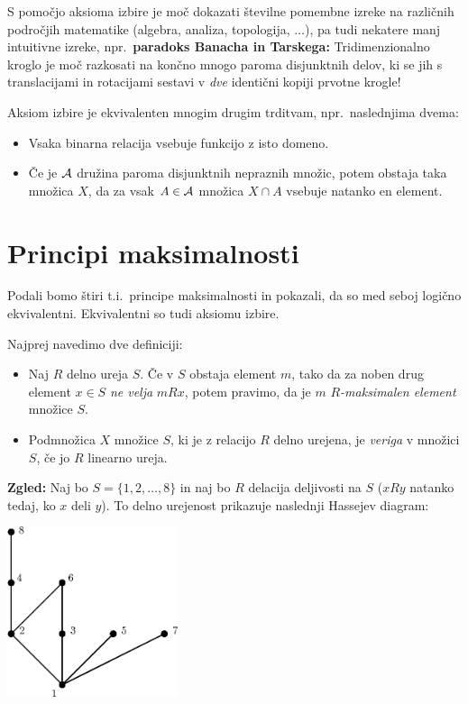 \documentclass[11pt,paper=b5,footinclude,headinclude]{scrbook} %
\begin{document}
\bigskip
S pomočjo aksioma izbire je moč dokazati številne pomembne izreke na različnih področjih matematike (algebra, analiza, topologija, $\ldots$), pa tudi nekatere manj intuitivne izreke, npr.~\textbf{paradoks Banacha in Tarskega:} Tridimenzionalno kroglo je moč razkosati na končno mnogo paroma disjunktnih delov, ki se jih s translacijami in rotacijami sestavi v {\em dve} identični kopiji prvotne krogle!

\bigskip
Aksiom izbire je ekvivalenten mnogim drugim trditvam, npr.~naslednjima dvema:
\begin{itemize}
  \item Vsaka binarna relacija vsebuje funkcijo z isto domeno.
  \item Če je ${\cal A}$ družina paroma disjunktnih nepraznih množic, potem obstaja taka  množica $X$, da za vsak $A\in {\cal A}$ množica $X\cap A$ vsebuje natanko en element.
\end{itemize}


\section{Principi maksimalnosti}

Podali bomo štiri t.i.~principe maksimalnosti in pokazali, da so med seboj logično ekvivalentni. Ekvivalentni so tudi aksiomu izbire.

\bigskip

Najprej navedimo dve definiciji:

\begin{itemize}
  \item Naj $R$ delno ureja $S$. Če v $S$ obstaja element $m$, tako da za noben drug element $x\in S$ {\em ne velja} $mRx$, potem pravimo, da je $m$ {\em $R$-maksimalen element} množice $S$.

  \item Podmnožica $X$ množice $S$, ki je z relacijo $R$ delno urejena, je {\em veriga} v množici $S$, če jo $R$ linearno ureja.
\end{itemize}



\medskip

\textbf{Zgled:}
Naj bo $S = \{1,2,\ldots, 8\}$ in naj bo $R$ delacija deljivosti na $S$ ($xRy$ natanko tedaj, ko $x$ deli $y$).
To delno urejenost prikazuje naslednji Hassejev diagram:

\medskip
\begin{center}
\includegraphics[height=50mm]{verige-deljivost.eps}
\end{center}
\end{document}
